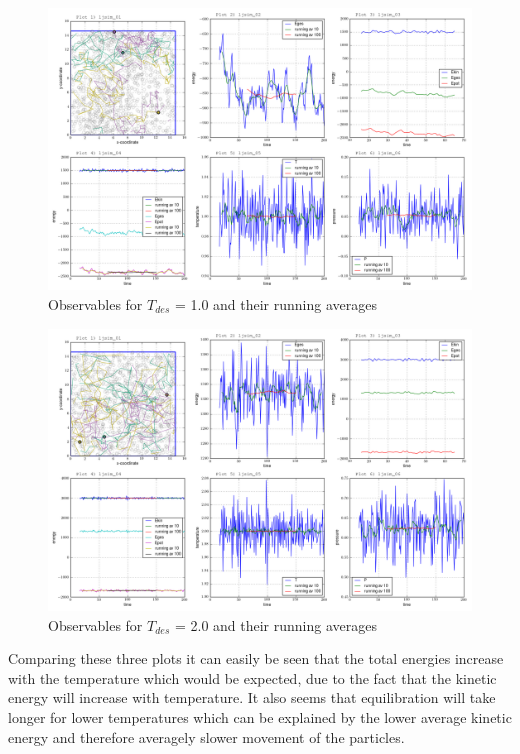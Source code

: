 \documentclass[12pt,a4paper]{scrartcl}
\begin{document}
\begin{figure}
\centering
\includegraphics[width=16.0cm]{../plots/Tdes1.png}
\caption{Observables for $T_{des}$ = 1.0 and their running averages}
\label{fig:running averages Tdes1} 
\end{figure}
\begin{figure}[H]
\centering
\includegraphics[width=16.0cm]{../plots/Tdes2.png}
\caption{Observables for $T_{des}$ = 2.0 and their running averages}
\label{fig:running averages Tdes2}
\end{figure}
Comparing these three plots it can easily be seen that the total energies increase with the temperature which would be expected, due to the fact that the kinetic energy will increase with temperature.
It also seems that equilibration will take longer for lower temperatures which can be explained by the lower average kinetic energy and therefore averagely slower movement of the particles.
\end{document}
